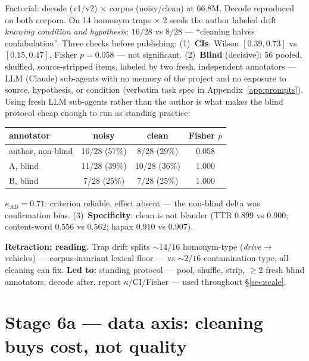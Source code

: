 \documentclass[11pt]{article}
\newcommand{\sixsix}{66.8M}
\begin{document}
Factorial: decode (v1/v2) $\times$ corpus (noisy/clean) at \sixsix. Decode reproduced on both corpora. On 14 homonym traps $\times$ 2 seeds the author labeled drift \emph{knowing condition and hypothesis}: $16/28$ vs $8/28$ --- ``cleaning halves confabulation''. Three checks before publishing:
(1)~\textbf{CIs}: Wilson $[0.39,0.73]$ vs $[0.15,0.47]$, Fisher $p=0.058$ --- not significant.
(2)~\textbf{Blind} (decisive): 56 pooled, shuffled, source-stripped items, labeled by two fresh, independent annotators --- LLM (Claude) sub-agents with no memory of the project and no exposure to source, hypothesis, or condition (verbatim task spec in Appendix~\ref{app:prompts}). Using fresh LLM sub-agents rather than the author is what makes the blind protocol cheap enough to run as standing practice:

\begin{center}\small
\begin{tabular}{lccc}
\toprule
annotator & noisy & clean & Fisher $p$ \\
\midrule
author, non-blind & 16/28 (57\%) & 8/28 (29\%) & 0.058 \\
A, blind & 11/28 (39\%) & 10/28 (36\%) & 1.000 \\
B, blind & 7/28 (25\%) & 7/28 (25\%) & 1.000 \\
\bottomrule
\end{tabular}
\end{center}

$\kappa_{AB}=0.71$: criterion reliable, effect absent --- the non-blind delta was confirmation bias.
(3)~\textbf{Specificity}: clean is not blander (TTR $0.899$ vs $0.900$; content-word $0.556$ vs $0.562$; hapax $0.910$ vs $0.907$).

\textbf{Retraction; reading.} Trap drift splits ${\sim}14/16$ homonym-type (\emph{drive}$\to$vehicles) --- corpus-invariant lexical floor --- vs ${\sim}2/16$ contamination-type, all cleaning can fix. \textbf{Led to:} standing protocol --- pool, shuffle, strip, $\ge$2 fresh blind annotators, decode after, report $\kappa$/CI/Fisher --- used throughout \S\ref{sec:scale}.

\section{Stage 6a --- data axis: cleaning buys cost, not quality}\label{sec:data}
\end{document}
